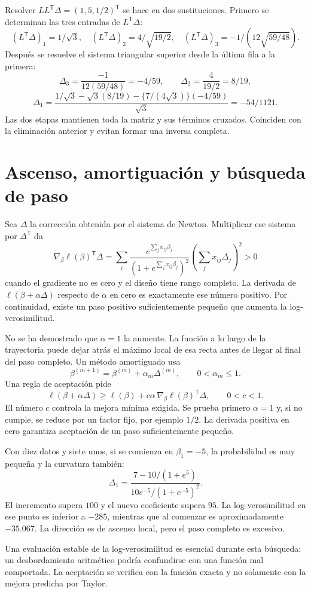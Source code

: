 \documentclass[11pt,a4paper]{article}
\newcommand{\T}{^{\mathsf T}}
\begin{document}
Resolver $LL\T\Delta=(1,5,1/2)\T$ se hace en dos sustituciones.
Primero se determinan las tres entradas de $L\T\Delta$:
\[
(L\T\Delta)_1=1/\sqrt3,\quad
(L\T\Delta)_2=4/\sqrt{19/2},\quad
(L\T\Delta)_3=-1/(12\sqrt{59/48}).
\]
Después se resuelve el sistema triangular superior desde la
última fila a la primera:
\[
\Delta_3=\frac{-1}{12(59/48)}=-4/59,\qquad
\Delta_2=\frac4{19/2}=8/19,
\]
\[
\Delta_1=\frac{1/\sqrt3-\sqrt3(8/19)
-\{7/(4\sqrt3)\}(-4/59)}{\sqrt3}=-54/1121.
\]
Las dos etapas mantienen toda la matriz y sus términos cruzados.
Coinciden con la eliminación anterior y evitan formar una inversa completa.

\clearpage
\section{Ascenso, amortiguación y búsqueda de paso}\label{logit45}
Sea $\Delta$ la corrección obtenida por el sistema de Newton.
Multiplicar ese sistema por $\Delta\T$ da
\[
\nabla_\beta\ell(\beta)\T\Delta
=\sum_i
\frac{e^{\sum_jx_{ij}\beta_j}}{(1+e^{\sum_jx_{ij}\beta_j})^2}
\left(\sum_jx_{ij}\Delta_j\right)^2>0
\]
cuando el gradiente no es cero y el diseño tiene rango completo.
La derivada de $\ell(\beta+\alpha\Delta)$ respecto de $\alpha$
en cero es exactamente ese número positivo.
Por continuidad, existe un paso positivo suficientemente pequeño
que aumenta la log-verosimilitud.

No se ha demostrado que $\alpha=1$ la aumente.
La función a lo largo de la trayectoria puede dejar atrás el máximo
local de esa recta antes de llegar al final del paso completo.
Un método amortiguado usa
\[
\beta^{(m+1)}=\beta^{(m)}+\alpha_m\Delta^{(m)},\qquad 0<\alpha_m\le1.
\]
Una regla de aceptación pide
\[
\ell(\beta+\alpha\Delta)\ge
\ell(\beta)+c\alpha\,\nabla_\beta\ell(\beta)\T\Delta,
\qquad 0<c<1.
\]
El número $c$ controla la mejora mínima exigida.
Se prueba primero $\alpha=1$ y, si no cumple, se reduce
por un factor fijo, por ejemplo $1/2$.
La derivada positiva en cero garantiza aceptación de un paso
suficientemente pequeño.

\begin{ejemplo}
Con diez datos y siete unos, si se comienza en $\beta_1=-5$,
la probabilidad es muy pequeña y la curvatura también:
\[
\Delta_1=
\frac{7-10/(1+e^5)}{10e^{-5}/(1+e^{-5})^2}.
\]
El incremento supera $100$ y el nuevo coeficiente supera $95$.
La log-verosimilitud en ese punto es inferior a $-285$,
mientras que al comenzar es aproximadamente $-35.067$.
La dirección es de ascenso local, pero el paso completo es excesivo.
\end{ejemplo}
Una evaluación estable de la log-verosimilitud es esencial durante
esta búsqueda: un desbordamiento aritmético podría confundirse con
una función mal comportada.
La aceptación se verifica con la función exacta y no solamente con
la mejora predicha por Taylor.
\end{document}
